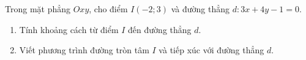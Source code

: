\begin{ex}%
Trong mặt phẳng $Oxy$, cho điểm $I(-2; 3)$ và đường thẳng $d\colon 3x+4y-1=0$.
\begin{enumerate}
\item Tính khoảng cách từ điểm $I$ đến đường thẳng $d$.
\item Viết phương trình đường tròn tâm $I$ và tiếp xúc với đường thẳng $d$.
\end{enumerate}
\end{ex}

